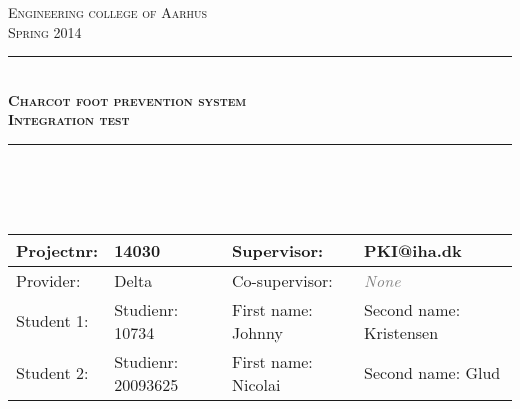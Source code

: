 \newcommand{\HRule}{\rule{\linewidth}{0.5mm}} %

\begin{center} %
 

\textsc{\LARGE Engineering college of Aarhus}\\[1.5cm] %
\textsc{\large Spring 2014}\\[0.5cm] %


\HRule \\[0.4cm]
{ \Large \bfseries \textsc{Charcot foot prevention system}}\\[0.4cm] %
{ \huge \bfseries \textsc{Integration test}} %
\HRule \\[1.5cm]
\ \\
\ \\
\vfill
\begin{table}[H]
\centering
    \begin{tabular}{|l|l|l|p{4cm}|}
    \hline
    Projectnr:   & 14030                                                       & Supervisor:             & PKI@iha.dk              \\ \hline
    Provider:    & Delta                                                       & Co-supervisor:          & \textcolor{gray}{\textit{None}}           \\ \hline
    Student  1:  & Studienr: 10734                                             & First name: Johnny      & Second name: Kristensen \\ \hline
    Student  2:  & Studienr: 20093625                                          & First name: Nicolai     & Second name: Glud       \\ \hline
    \end{tabular}


\end{table}
\end{center}
